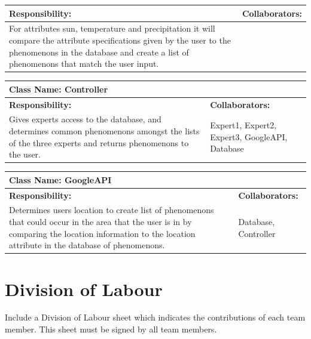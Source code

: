 \documentclass[]{article}
\begin{document}
\begin{enumerate}[a)]
\begin{table}[ht]
\begin{tabular}{|p{5cm}|p{5cm}|}
		\hline
		\textbf{Responsibility:} & \textbf{Collaborators:} \\
		\hline
		For attributes sun, temperature and precipitation it will compare the attribute specifications given by the user to the phenomenons in the database and create a list of phenomenons that match the user input.\vspace{1in} & \\
		\hline
		\end{tabular}
	\end{table}
	\begin{table}[ht]
		\centering
		\begin{tabular}{|p{5cm}|p{5cm}|}
		\hline 
		 \multicolumn{2}{|l|}{\textbf{Class Name: Controller}} \\
		\hline
		\textbf{Responsibility:} & \textbf{Collaborators:} \\
		\hline
		Gives experts access to the database, and determines common phenomenons amongst the lists of the three experts and returns phenomenons to the user. \vspace{1in} & Expert1, Expert2, Expert3, GoogleAPI, Database\\
		\hline
		\end{tabular}
	\end{table}
	\begin{table}[ht]
		\centering
		\begin{tabular}{|p{5cm}|p{5cm}|}
		\hline 
		 \multicolumn{2}{|l|}{\textbf{Class Name: GoogleAPI}} \\
		\hline
		\textbf{Responsibility:} & \textbf{Collaborators:} \\
		\hline
		Determines users location to create list of phenomenons that could occur in the area that the user is in by comparing the location information to the location attribute in the database of phenomenons.\vspace{1in} & Database, Controller\\
		\hline
		\end{tabular}
	\end{table}
\end{enumerate}

\appendix
\section{Division of Labour}
\label{sec:division_of_labour}
Include a Division of Labour sheet which indicates the contributions of each team member. This sheet must be signed by all team members.
\end{document}

